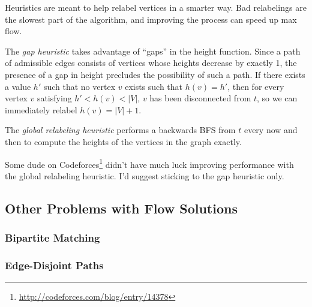 Heuristics are meant to help relabel vertices in a smarter way. Bad relabelings are the slowest part of the algorithm, and improving the process can speed up max flow.

The \textit{gap heuristic} takes advantage of ``gaps'' in the height function. Since a path of admissible edges consists of vertices whose heights decrease by exactly 1, the presence of a gap in height precludes the possibility of such a path. If there exists a value $h'$ such that no vertex $v$ exists such that $h(v)=h'$, then for every vertex $v$ satisfying $h' < h(v) < |V|$, $v$ has been disconnected from $t$, so we can immediately relabel $h(v)=|V| + 1$.

The \textit{global relabeling heuristic} performs a backwards BFS from $t$ every now and then to compute the heights of the vertices in the graph exactly.

Some dude on Codeforces\footnote{\url{http://codeforces.com/blog/entry/14378}} didn't have much luck improving performance with the global relabeling heuristic. I'd suggest sticking to the gap heuristic only.

\subsection{Other Problems with Flow Solutions}

\subsubsection{Bipartite Matching}

\subsubsection{Edge-Disjoint Paths}

